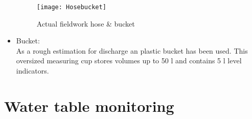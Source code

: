 \begin{itemize}
\begin{figure}[h!]
 \centering\texttt{[image: Hosebucket]}
 \captionsetup{justification=centering}
 \caption{Actual fieldwork hose \& bucket}
 \label{fig:Hosebucket}
\end{figure}

\item Bucket: \\
As a rough estimation for discharge an  plastic bucket has been used. This oversized measuring cup stores volumes up to 50 l and contains 5 l level indicators. 

\end{itemize}

\bigskip
\section{Water table monitoring} 

